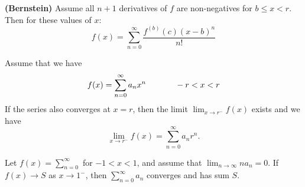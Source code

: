 \documentclass[10pt,a4paper]{book}
\begin{document}
\begin{Thm}
\textbf{(Bernstein)}
Assume all $n+1$ derivatives of $f$ are non-negatives for $b \leq x < r$. Then for these values of $x$:
$$f(x) = \sum_{n=0}^\infty \dfrac{f^{(b)}(c)(x-b)^n}{n!}$$
\end{Thm}
\begin{Thm}
 Assume that we have
 $$f(x) = \sum_{n=0}^\infty a_nx^n \sp \textit\ \ -r<x<r$$
 If the series also converges at $x = r$, then the limit $\lim_{x \to r^-}f(x)$ exists and we have
 $$\lim_{x \to r^-}f(x) = \sum_{n=0}^\infty a_nr^n.$$
 
\end{Thm}
\begin{Thm}
Let $f(x) = \sum_{n=0}^\infty$ for $-1 < x < 1$, and assume that
$\lim_{n \to \infty}na_n = 0.$ If $f(x) \rightarrow S$ as $x \rightarrow 1^-$, then $\sum_{n=0}^\infty a_n$ converges and has sum $S$.
\end{Thm}
\end{document}

